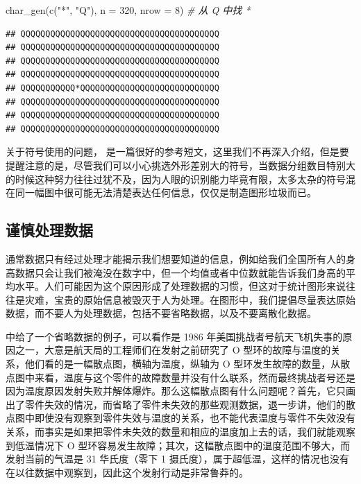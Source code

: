 \documentclass[
  b5paper,
  UTF8,twoside]{book}
\newenvironment{Shaded}{\begin{snugshade}}{\end{snugshade}}
\newcommand{\AttributeTok}[1]{\textcolor[rgb]{0.77,0.63,0.00}{#1}}
\newcommand{\CommentTok}[1]{\textcolor[rgb]{0.56,0.35,0.01}{\textit{#1}}}
\newcommand{\DecValTok}[1]{\textcolor[rgb]{0.00,0.00,0.81}{#1}}
\newcommand{\FunctionTok}[1]{\textcolor[rgb]{0.00,0.00,0.00}{#1}}
\newcommand{\NormalTok}[1]{#1}
\newcommand{\StringTok}[1]{\textcolor[rgb]{0.31,0.60,0.02}{#1}}
\begin{document}
\begin{Shaded}
\begin{Highlighting}[]
\FunctionTok{char\_gen}\NormalTok{(}\FunctionTok{c}\NormalTok{(}\StringTok{"*"}\NormalTok{, }\StringTok{"Q"}\NormalTok{), }\AttributeTok{n =} \DecValTok{320}\NormalTok{, }\AttributeTok{nrow =} \DecValTok{8}\NormalTok{) }\CommentTok{\# 从 Q 中找 *}
\end{Highlighting}
\end{Shaded}

\begin{verbatim}
## QQQQQQQQQQQQQQQQQQQQQQQQQQQQQQQQQQQQQQQQ
## QQQQQQQQQQQQQQQQQQQQQQQQQQQQQQQQQQQQQQQQ
## QQQQQQQQQQQQQQQQQQQQQQQQQQQQQQQQQQQQQQQQ
## QQQQQQQQQQQQQQQQQQQQQQQQQQQQQQQQQQQQQQQQ
## QQQQQQQQQQQ*QQQQQQQQQQQQQQQQQQQQQQQQQQQQ
## QQQQQQQQQQQQQQQQQQQQQQQQQQQQQQQQQQQQQQQQ
## QQQQQQQQQQQQQQQQQQQQQQQQQQQQQQQQQQQQQQQQ
## QQQQQQQQQQQQQQQQQQQQQQQQQQQQQQQQQQQQQQQQ
\end{verbatim}

关于符号使用的问题，\citet{Robinson03} 是一篇很好的参考短文，这里我们不再深入介绍，但是要提醒注意的是，尽管我们可以小心挑选外形差别大的符号，当数据分组数目特别大的时候这种努力往往过犹不及，因为人眼的识别能力毕竟有限，太多太杂的符号混在同一幅图中很可能无法清楚表达任何信息，仅仅是制造图形垃圾而已。

\hypertarget{subsec:data-processing}{%
\subsection{谨慎处理数据}\label{subsec:data-processing}}

通常数据只有经过处理才能揭示我们想要知道的信息，例如给我们全国所有人的身高数据只会让我们被淹没在数字中，但一个均值或者中位数就能告诉我们身高的平均水平。人们可能因为这个原因形成了处理数据的习惯，但这对于统计图形来说往往是灾难，宝贵的原始信息被毁灭于人为处理。在图形中，我们提倡尽量表达原始数据，而不要人为处理数据，包括不要省略数据，以及不要离散化数据。

\citet{Cleveland85} 中给了一个省略数据的例子，可以看作是 1986 年美国挑战者号航天飞机失事的原因之一，大意是航天局的工程师们在发射之前研究了 O 型环的故障与温度的关系，他们看的是一幅散点图，横轴为温度，纵轴为 O 型环发生故障的数量，从散点图中来看，温度与这个零件的故障数量并没有什么联系，然而最终挑战者号还是因为温度原因发射失败并解体爆炸。那么这幅散点图有什么问题呢？首先，它只画出了零件失效的情况，而省略了零件未失效的那些观测数据，退一步讲，他们的散点图中即使没有观察到零件失效与温度的关系，也不能代表温度与零件不失效没有关系，而事实是如果把零件未失效的数量和相应的温度加上去的话，我们就能观察到低温情况下 O 型环容易发生故障；其次，这幅散点图中的温度范围不够大，而发射当前的气温是 31 华氏度（零下 1 摄氏度），属于超低温，这样的情况也没有在以往数据中观察到，因此这个发射行动是非常鲁莽的。
\end{document}
